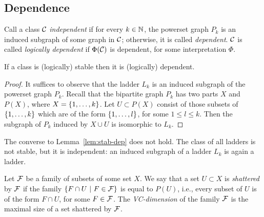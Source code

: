 \subsection{Dependence}
Call a class ${\cal C}$ \emph{independent}
if for every $k\in\mathbb{N}$, the powerset graph $P_k$
is an induced subgraph of some graph in ${\cal C}$;
otherwise, it is called \emph{dependent}. 
${\cal C}$ is called \emph{logically dependent} if $\Phi({\cal C})$
is dependent, for some interpretation $\Phi$.

\begin{lemma}\label{lem:stab-dep}
  If a class is (logically) stable then it is (logically) dependent. 
\end{lemma}
\begin{proof}\label{pf:}
  It suffices to observe that the ladder $L_k$
  is an induced subgraph of the powerset graph $P_k$.
  Recall that the bipartite graph $P_k$ has two parts $X$ and $P(X)$, where $X=\{1,\ldots,k\}$. Let  $U\subset P(X)$ consist of those subsets of $\{1,\ldots,k\}$ which are of the form $\{1,\ldots,l\}$, for some $1\le l\le k$. Then the subgraph of $P_k$ induced by $X\cup U$
  is isomorphic to $L_k$.
\end{proof}

\begin{example}
  The converse to Lemma~\ref{lem:stab-dep} does not hold.
  The class of all ladders is not stable, but it is 
  independent: an induced subgraph of a ladder $L_k$ is again a ladder.
\end{example}

Let ${\cal F}$ be a family of subsets of some set $X$.
We say that a set $U\subset X$ is \emph{shattered}
by ${\cal F}$ if the family $\{F\cap U\ |\ F\in{\cal F}\}$
is equal to $P(U)$, i.e.,  every subset of $U$
is of the form $F\cap U$, for some $F\in{\cal F}$.
The \emph{VC-dimension} of the family ${\cal F}$
is the maximal size of a set shattered by ${\cal F}$.
%
%
%
%
%

